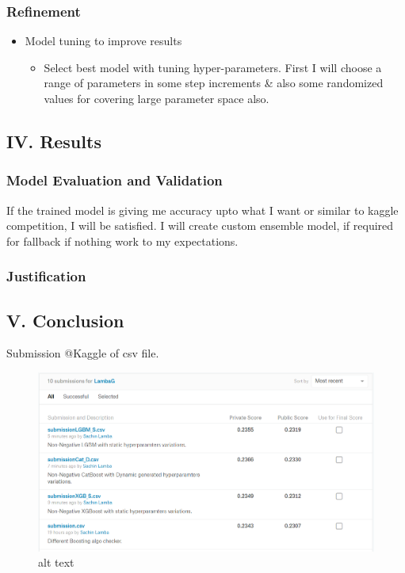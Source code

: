 \documentclass[11pt]{article}
\makeatletter
\def\maxwidth{\ifdim\Gin@nat@width>\linewidth\linewidth
    \else\Gin@nat@width\fi}
\let\Oldincludegraphics\includegraphics
\renewcommand{\includegraphics}[1]{\Oldincludegraphics[width=.8\maxwidth]{#1}}
\providecommand{\tightlist}{%
      \setlength{\itemsep}{0pt}\setlength{\parskip}{0pt}}
\makeatother
\begin{document}
    \subsubsection{Refinement}\label{refinement}

    \begin{itemize}
\tightlist
\item
  Model tuning to improve results

  \begin{itemize}
  \tightlist
  \item
    Select best model with tuning hyper-parameters. First I will choose
    a range of parameters in some step increments \& also some
    randomized values for covering large parameter space also.
  \end{itemize}
\end{itemize}

    \subsection{IV. Results}\label{iv.-results}

    \subsubsection{Model Evaluation and
Validation}\label{model-evaluation-and-validation}

    If the trained model is giving me accuracy upto what I want or similar
to kaggle competition, I will be satisfied. I will create custom
ensemble model, if required for fallback if nothing work to my
expectations.

    \subsubsection{Justification}\label{justification}

    \subsection{V. Conclusion}\label{v.-conclusion}

    Submission @Kaggle of csv file.

\begin{figure}
\centering
\includegraphics{./submissions.png}
\caption{alt text}
\end{figure}
\end{document}
